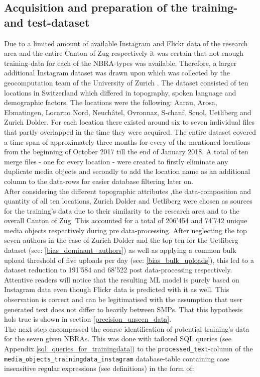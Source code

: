 \subsection{Acquisition and preparation of the training- and test-dataset} \label{preparation_training_data}
Due to a limited amount of available Instagram and Flickr data of the research area and the entire Canton of Zug respectively it was certain that not enough training-data for each of the NBRA-types was available. Therefore, a larger additional Instagram dataset was drawn upon which was collected by the geocomputation team of the University of Zurich \parencite{Gruzd2016}. The dataset consisted of ten locations in Switzerland which differed in topography, spoken language and demographic factors. The locations were the following: Aarau, Arosa, Ebmatingen, Locarno Nord, Neuch\^{a}tel, Ovronnaz, S-chanf, Scuol, Uetliberg and Zurich Dolder. For each location there existed around six to seven individual files that partly overlapped in the time they were acquired. The entire dataset covered a time-span of approximately three months for every of the mentioned locations from the beginning of October 2017 till the end of January 2018. A total of ten merge files - one for every location - were created to firstly eliminate any duplicate media objects and secondly to add the location name as an additional column to the data-rows for easier database filtering later on.\\
\newline
After considering the different topographic attributes ,the data-composition and quantity of all ten locations, Zurich Dolder and Uetliberg were chosen as sources for the training's data due to their similarity to the research area and to the overall Canton of Zug. This accounted for a total of 206'454 and 74'742 unique media objects respectively during pre data-processing. After neglecting the top seven authors in the case of Zurich Dolder and the top ten for the Uetliberg dataset (see: \ref{bias_dominant_authors}) as well as applying a common bulk upload threshold of five uploads per day (see: \ref{bias_bulk_uploads}), this led to a dataset reduction to 191'584 and 68'522 post data-processing respectively. Attentive readers will notice that the resulting ML model is purely based on Instagram data even though Flickr data is predicted with it as well. This observation is correct and can be legitimatised with the assumption that user generated text does not differ to heavily between SMPs. That this hypothesis hols true is shown in section \ref{precision_unseen_data}.\\
\newline
The next step encompassed the coarse identification of potential training's data for the seven given NBRAs. This was done with tailored SQL queries (see Appendix \ref{sql_queries_for_trainingdata}) to the \texttt{processed\_text}-column of the \texttt{media\_objects\_trainingdata\_instagram} database-table containing case insensitive regular expressions (see definitions) in the form of:

